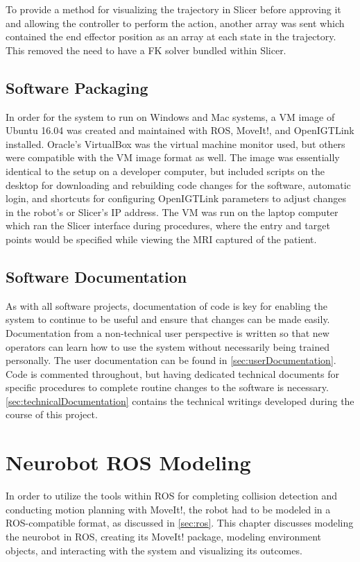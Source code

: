 \documentclass[12pt]{report}
\makeatletter
\renewcommand{\todo}[2][]{%
    \@todo[caption={#2}, #1]{\begin{spacing}{0.5}#2\end{spacing}}%
}
\makeatother
\begin{document}
To provide a method for visualizing the trajectory in Slicer before approving it and allowing the controller to perform the action, another array was sent which contained the end effector position as an array at each state in the trajectory. This removed the need to have a FK solver bundled within Slicer. \todo{Revisit this when completed.}


\section{Software Packaging}
In order for the system to run on Windows and Mac systems, a VM image of Ubuntu 16.04 was created and maintained with ROS, MoveIt!, and OpenIGTLink installed. Oracle's VirtualBox was the virtual machine monitor used, but others were compatible with the VM image format as well. The image was essentially identical to the setup on a developer computer, but included scripts on the desktop for downloading and rebuilding code changes for the software, automatic login, and shortcuts for configuring OpenIGTLink parameters to adjust changes in the robot's or Slicer's IP address. The VM was run on the laptop computer which ran the Slicer interface during procedures, where the entry and target points would be specified while viewing the MRI captured of the patient.


\section{Software Documentation}
As with all software projects, documentation of code is key for enabling the system to continue to be useful and ensure that changes can be made easily. Documentation from a non-technical user perspective is written so that new operators can learn how to use the system without necessarily being trained personally. The user documentation can be found in \autoref{sec:userDocumentation}. Code is commented throughout, but having dedicated technical documents for specific procedures to complete routine changes to the software is necessary. \autoref{sec:technicalDocumentation} contains the technical writings developed during the course of this project.


\chapter{Neurobot ROS Modeling}
In order to utilize the tools within ROS for completing collision detection and conducting motion planning with MoveIt!, the robot had to be modeled in a ROS-compatible format, as discussed in \autoref{sec:ros}. This chapter discusses modeling the neurobot in ROS, creating its MoveIt! package, modeling environment objects, and interacting with the system and visualizing its outcomes.
\end{document}
